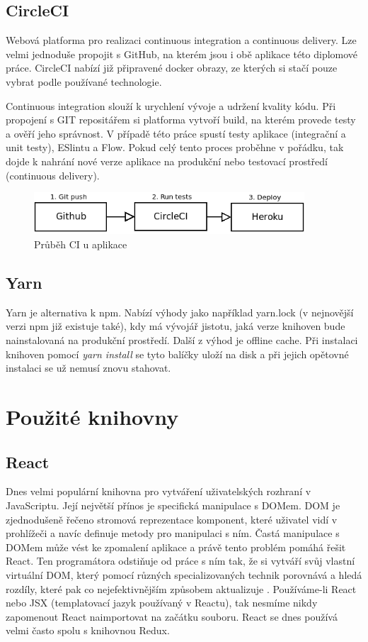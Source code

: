 \documentclass[thesis=M,czech]{FITthesis}[2018/10/20]
\begin{document}
	\subsection{CircleCI}
	Webová platforma pro realizaci continuous integration a continuous delivery. Lze velmi jednoduše propojit s GitHub, na kterém jsou i obě aplikace této diplomové práce. CircleCI nabízí již připravené docker obrazy, ze kterých si stačí pouze vybrat podle používané technologie.

Continuous integration slouží k urychlení vývoje a udržení kvality kódu. Při propojení s GIT repositářem si platforma vytvoří build, na kterém provede testy a ověří jeho správnost. V případě této práce spustí testy aplikace (integrační a unit testy), ESlintu a Flow. Pokud celý tento proces proběhne v pořádku, tak dojde k nahrání nové verze aplikace na produkční nebo testovací prostředí (continuous delivery).

\begin{figure}[h]
\caption{Průběh CI u aplikace}
\centering
\includegraphics[width=0.9\textwidth]{diagrams/circleci}
\end{figure}
	\subsection{Yarn}
	Yarn je alternativa k npm. Nabízí výhody jako například yarn.lock (v nejnovější verzi npm již existuje také), kdy má vývojář jistotu, jaká verze knihoven bude nainstalovaná na produkční prostředí. Další z výhod je offline cache. Při instalaci knihoven pomocí \textit{yarn install} se tyto balíčky uloží na disk a při jejich opětovné instalaci se už nemusí znovu stahovat.
\newpage
\section{Použité knihovny}
	\subsection{React}
	Dnes velmi populární knihovna pro vytváření uživatelských rozhraní v JavaScriptu. Její největší přínos je specifická manipulace s DOMem. DOM je zjednodušeně řečeno stromová reprezentace komponent, které uživatel vidí v prohlížeči a navíc definuje metody pro manipulaci s ním. Častá manipulace s DOMem může vést ke zpomalení aplikace a právě tento problém pomáhá řešit React. Ten programátora odstiňuje od práce s ním tak, že si vytváří svůj vlastní virtuální DOM, který pomocí různých specializovaných technik porovnává a hledá rozdíly, které pak co nejefektivnějším způsobem aktualizuje \cite{react}. Používáme-li React nebo JSX (templatovací jazyk používaný v Reactu), tak nesmíme nikdy zapomenout React naimportovat na začátku souboru. React se dnes používá velmi často spolu s knihovnou Redux.
\end{document}
